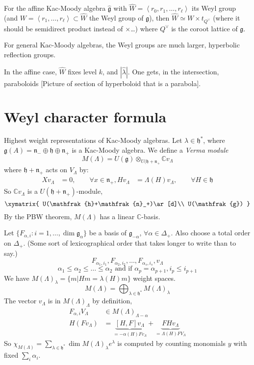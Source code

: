 \begin{proposition}
\label{proposition-Weyl-group-of-affine-Kac-Moody-algebra}
For the affine Kac-Moody algebra $\hat{\mathfrak{g}}$
 with $\hat{W}=\left<r_0,r_1,\ldots,r_\ell\right>$ its Weyl group 
(and $W=\left<r_1,\ldots,r_\ell\right>\subset \hat{W}$ the Weyl group of
$\mathfrak{g}$), then $\hat{W} \simeq W\times t_{Q^\vee}$ (where it should be
semidirect product instead of $\times$…) where $Q^\vee$ is the
coroot lattice of $\mathfrak{g}$.
\end{proposition}

\begin{remark}
\label{remark-Weyl-groups-are-large-for-other-Kac-Moody-algebras}
For general Kac-Moody algebras, the Weyl groups are much larger, hyperbolic
reflection groups.
\end{remark}

In the affine case, $\hat{W}$ fixes level $k$, and $|\hat{\lambda}|$. One gets,
in the intersection, paraboloids [Picture of section of hyperboloid that is a
parabola].

\section{Weyl character formula}
\label{section-Weyl-character-formula}
Highest weight representations of Kac-Moody algebras. 
Let $\lambda \in \mathfrak{h}^*$, where
$\mathfrak{g}(A)=\mathfrak{n}_-\oplus\mathfrak{h}\oplus \mathfrak{n}_+$ 
is a Kac-Moody algebra. We define a {\it Verma module} 
$$
M(\Lambda)
=U(\mathfrak{g}) \otimes_{U(\mathfrak{h}+\mathfrak{n}_+}\mathbb{C}v_\Lambda
$$
where $\mathfrak{h}+\mathfrak{n}_+$ acts on $V_\Lambda$ by:
\begin{align*}
Xv_\Lambda&=0,\qquad \forall x \in \mathfrak{n}_+,
Hv_\Lambda&=\Lambda(H)v_\Lambda,\qquad \forall H \in \mathfrak{h}
\end{align*}
So $\mathbb{C} v_\Lambda$ is a $U(\mathfrak{h}+\mathfrak{n}_+)$-module,
$$
\xymatrix{
U(\mathfrak{h}+\mathfrak{n}_+)\ar[d]\\
U(\mathfrak{g})
}
$$
By the PBW theorem, $M(\Lambda)$ has a linear $\mathbb{C}$-basis.

Let $\{F_{\alpha,i}:i = 1,\ldots, \dim \mathfrak{g}_\alpha\}$ be a basis of
$\mathfrak{g}_{-\alpha}$, $\forall \alpha \in \Delta_+$. 
Also choose a total order on $\Delta_+$. (Some sort of lexicographical order
that takes longer to write than to say.)
$$
F_{\alpha_1,i_1},F_{\alpha_2,i_2},\ldots,F_{\alpha_s,i_s},v_\Lambda
$$
$$
\alpha_1\leq \alpha_2\leq \ldots \leq \alpha_2\text{ and if }
\alpha_p=\alpha_{p+1}, i_p \leq  i_{p+1}
$$
We have $M(\Lambda)_\lambda=\{m|Hm=\lambda(H)m\}$ weight spaces.
$$
M(\Lambda)=\bigoplus_{\lambda \in \mathfrak{h}^*}M(\Lambda)_\lambda
$$
The vector $v_{\Lambda}$ is in $M(\Lambda)_\Lambda$ by definition,
\begin{align*}
F_{\alpha,i}V_\Lambda &\in M(\Lambda)_{\Lambda-\alpha}\\
H(Fv_\Lambda)&=\underbrace{[H,F]v_\Lambda}_{=-\alpha(H)Fv_\Lambda}
+\underbrace{FHv_\Lambda}_{=\Lambda(H)FV_\Lambda}
\end{align*}
So $\chi_{M(\Lambda)}=\sum_{\lambda \in \mathfrak{h}^*}\dim M(\Lambda)_\lambda
e^{\lambda}$
is computed by counting monomials $y$ with fixed $\sum_{i}\alpha_i$.

